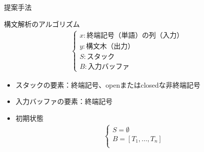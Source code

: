 \documentclass[aspectratio=43,unicode,10pt]{beamer}
\newcommand{\term}{終端記号}
\newcommand{\nt}{非終端記号}
\begin{document}
\begin{frame}{提案手法}
  \begin{block}{構文解析のアルゴリズム}
    \begin{gather*}
      \begin{cases}
        x: \text{\term （単語）の列（入力）} \\
        y: \text{構文木（出力）} \\
        S: \text{スタック} \\
        B: \text{入力バッファ}
      \end{cases}
    \end{gather*}
    \begin{itemize}
      \item スタックの要素：\term、openまたはclosedな\nt
      \item 入力バッファの要素：\term
      \item 初期状態
        \begin{gather*}
          \begin{cases}
            S = \emptyset \\
            B = [T_1, \ldots, T_n] \\
          \end{cases}
        \end{gather*}
    \end{itemize}
  \end{block}
\end{frame}
\end{document}

